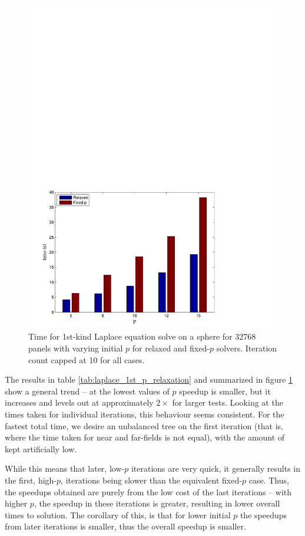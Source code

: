 \begin{figure}[h]
	\centering
	\includegraphics[width=14cm]{img/LaplaceRelaxationP.pdf}
	\caption{Time for 1st-kind Laplace equation solve on a sphere for 32768 panels with varying initial $p$ for relaxed and fixed-$p$ solvers. Iteration count capped at 10 for all cases.}
	\label{fig:laplace_p_speedup}
\end{figure}

The results in table \ref{tab:laplace_1st_p_relaxation} and summarized in figure \ref{fig:laplace_p_speedup} show a general trend -- at the lowest values of $p$ speedup is smaller, but it increases and levels out at approximately $2\times$ for larger tests. Looking at the times taken for individual iterations, this behaviour seems consistent. For the fastest total time, we desire an unbalanced tree on the first iteration (that is, where the time taken for near and far-fields is not equal), with the amount of {\ptop} kept artificially low.

While this means that later, low-$p$ iterations are very quick, it generally results in the first, high-$p$, iterations being slower than the equivalent fixed-$p$ case. Thus, the speedups obtained are purely from the low cost of the last iterations -- with higher $p$, the speedup in these iterations is greater, resulting in lower overall times to solution. The corollary of this, is that for lower initial $p$ the speedups from later iterations is smaller, thus the overall speedup is smaller.

